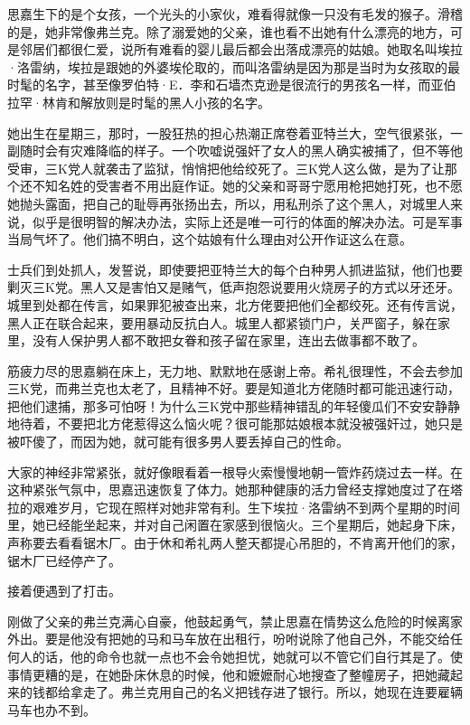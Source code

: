 \par 思嘉生下的是个女孩，一个光头的小家伙，难看得就像一只没有毛发的猴子。滑稽的是，她非常像弗兰克。除了溺爱她的父亲，谁也看不出她有什么漂亮的地方，可是邻居们都很仁爱，说所有难看的婴儿最后都会出落成漂亮的姑娘。她取名叫埃拉·洛雷纳，埃拉是跟她的外婆埃伦取的，而叫洛雷纳是因为那是当时为女孩取的最时髦的名字，甚至像罗伯特·E．李和石墙杰克逊是很流行的男孩名一样，而亚伯拉罕·林肯和解放则是时髦的黑人小孩的名字。
\par 她出生在星期三，那时，一股狂热的担心热潮正席卷着亚特兰大，空气很紧张，一副随时会有灾难降临的样子。一个吹嘘说强奸了女人的黑人确实被捕了，但不等他受审，三K党人就袭击了监狱，悄悄把他给绞死了。三K党人这么做，是为了让那个还不知名姓的受害者不用出庭作证。她的父亲和哥哥宁愿用枪把她打死，也不愿她抛头露面，把自己的耻辱再张扬出去，所以，用私刑杀了这个黑人，对城里人来说，似乎是很明智的解决办法，实际上还是唯一可行的体面的解决办法。可是军事当局气坏了。他们搞不明白，这个姑娘有什么理由对公开作证这么在意。
\par 士兵们到处抓人，发誓说，即使要把亚特兰大的每个白种男人抓进监狱，他们也要剿灭三K党。黑人又是害怕又是赌气，低声抱怨说要用火烧房子的方式以牙还牙。城里到处都在传言，如果罪犯被查出来，北方佬要把他们全都绞死。还有传言说，黑人正在联合起来，要用暴动反抗白人。城里人都紧锁门户，关严窗子，躲在家里，没有人保护男人都不敢把女眷和孩子留在家里，连出去做事都不敢了。
\par 筋疲力尽的思嘉躺在床上，无力地、默默地在感谢上帝。希礼很理性，不会去参加三K党，而弗兰克也太老了，且精神不好。要是知道北方佬随时都可能迅速行动，把他们逮捕，那多可怕呀！为什么三K党中那些精神错乱的年轻傻瓜们不安安静静地待着，不要把北方佬惹得这么恼火呢？很可能那姑娘根本就没被强奸过，她只是被吓傻了，而因为她，就可能有很多男人要丢掉自己的性命。
\par 大家的神经非常紧张，就好像眼看着一根导火索慢慢地朝一管炸药烧过去一样。在这种紧张气氛中，思嘉迅速恢复了体力。她那种健康的活力曾经支撑她度过了在塔拉的艰难岁月，它现在照样对她非常有利。生下埃拉·洛雷纳不到两个星期的时间里，她已经能坐起来，并对自己闲置在家感到很恼火。三个星期后，她起身下床，声称要去看看锯木厂。由于休和希礼两人整天都提心吊胆的，不肯离开他们的家，锯木厂已经停产了。
\par 接着便遇到了打击。
\par 刚做了父亲的弗兰克满心自豪，他鼓起勇气，禁止思嘉在情势这么危险的时候离家外出。要是他没有把她的马和马车放在出租行，吩咐说除了他自己外，不能交给任何人的话，他的命令也就一点也不会令她担忧，她就可以不管它们自行其是了。使事情更糟的是，在她卧床休息的时候，他和嬷嬷耐心地搜查了整幢房子，把她藏起来的钱都给拿走了。弗兰克用自己的名义把钱存进了银行。所以，她现在连要雇辆马车也办不到。
